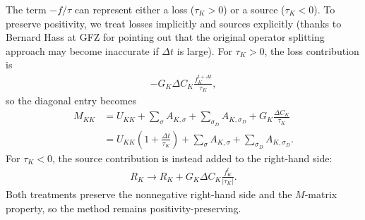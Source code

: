 \documentclass[11pt]{article}
\begin{document}
The term $-f/\tau$ can represent either a loss ($\tau_K>0$) or a source
($\tau_K<0$). To preserve positivity, we treat losses implicitly and sources
explicitly (thanks to Bernard Hass at GFZ for pointing out that the original
operator splitting approach may become inaccurate if $\Delta t$ is large). For $\tau_K>0$, the loss contribution is
\begin{align}
  -G_K\Delta C_K\frac{f_K^{t+\Delta t}}{\tau_K},
\end{align}
so the diagonal entry becomes
\begin{align}
  M_{KK} &= U_{KK} + \sum_{\sigma} A_{K,\sigma} + \sum_{\sigma_D} A_{K,\sigma_D}
  + G_K\frac{\Delta C_K}{\tau_K} \\
  &= U_{KK}\left(1+\frac{\Delta t}{\tau_K}\right)
  + \sum_{\sigma} A_{K,\sigma} + \sum_{\sigma_D} A_{K,\sigma_D}.
\end{align}
For $\tau_K<0$, the source contribution is instead added to the right-hand side:
\begin{align}
  R_K \longrightarrow R_K + G_K\Delta C_K\frac{f_K^t}{|\tau_K|}.
\end{align}
Both treatments preserve the nonnegative right-hand side and the
$M$-matrix property, so the method remains positivity-preserving.



\end{document}
